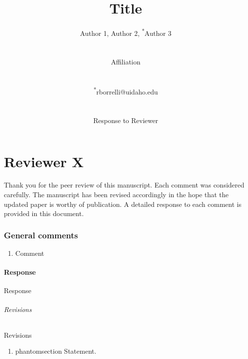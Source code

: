 \documentclass[11pt,a4paper]{article}
\makeatletter
\newcommand{\labeltext}[3][]{%
    \@bsphack%
    \csname phantomsection\endcsname %
    \def\tst{#1}%
    \def\labelmarkup{} %
    \def\refmarkup{}%
    \ifx\tst\empty\def\@currentlabel{\refmarkup{#2}}{\label{#3}}%
    \else\def\@currentlabel{\refmarkup{#1}}{\label{#3}}\fi%
    \@esphack%
    \labelmarkup{#2}%
}
\makeatother
\begin{document}
\begin{titlepage}
    \title{Title}
    \author{
        Author 1, 
        Author 2, 
        \textsuperscript{*}Author 3
        \\ \\ \\
        Affiliation
        \\ \\ \\
        \textsuperscript{*}rborrelli@uidaho.edu
        \\ \\ \\ 
        Response to Reviewer
    }
\clearpage %
\maketitle
\thispagestyle{empty} %
\end{titlepage}

\part*{Reviewer X}

\noindent Thank you for the peer review of this manuscript. Each comment was considered carefully. The manuscript has been revised accordingly in the hope that the updated paper is worthy of publication. A detailed response to each comment is provided in this document. 

\section*{General comments}
\begin{enumerate}[series=innerlist,topsep=0pt,itemsep=-0.5ex,partopsep=1ex,parsep=1ex,label=(\arabic*),align=left,leftmargin=*]
    \item Comment
\end{enumerate}

\subsection*{Response}
Response

\paragraph*{Revisions}
Revisions
\begin{enumerate}[leftmargin=.5in,rightmargin=.5in,topsep=0pt,itemsep=-1ex,partopsep=1ex,parsep=1ex,label=(\roman*)]
    \item\labeltext{Statement.}{1-label}
\end{enumerate}
\end{document}
